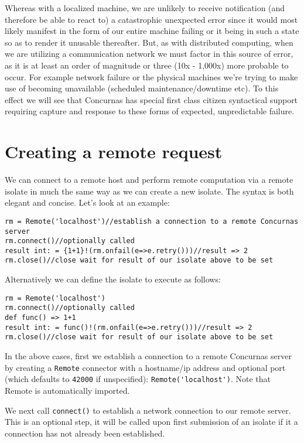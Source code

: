 \documentclass[conc-doc]{subfiles}
\begin{document}
Whereas with a localized machine, we are unlikely to receive notification (and therefore be able to react to) a catastrophic unexpected error since it would most likely manifest in the form of our entire machine failing or it being in such a state so as to render it unusable thereafter. But, as with distributed computing, when we are utilizing a communication network we must factor in this source of error, as it is at least an order of magnitude or three (10x - 1,000x) more probable to occur. For example network failure or the physical machines we're trying to make use of becoming unavailable (scheduled maintenance/downtime etc). To this effect we will see that Concurnas has special first class citizen syntactical support requiring capture and response to these forms of expected, unpredictable failure.

\section{Creating a remote request}	
We can connect to a remote host and perform remote computation via a remote isolate in much the same way as we can create a new isolate. The syntax is both elegant and concise. Let's look at an example:
\begin{lstlisting}
rm = Remote('localhost')//establish a connection to a remote Concurnas server
rm.connect()//optionally called
result int: = {1+1}!(rm.onfail(e=>e.retry()))//result => 2
rm.close()//close wait for result of our isolate above to be set
\end{lstlisting}

Alternatively we can define the isolate to execute as follows:

\begin{lstlisting}
rm = Remote('localhost')
rm.connect()//optionally called
def func() => 1+1
result int: = func()!(rm.onfail(e=>e.retry()))//result => 2
rm.close()//close wait for result of our isolate above to be set
\end{lstlisting}

In the above cases, first we establish a connection to a remote Concurnas server by creating a \lstinline{Remote} connector with a hostname/ip address and optional port (which defaults to \lstinline{42000} if unspecified): \lstinline{Remote('localhost')}. Note that Remote is automatically imported.

We next call \lstinline{connect()} to establish a network connection to our remote server. This is an optional step, it will be called upon first submission of an isolate if it a connection has not already been established.
\end{document}

